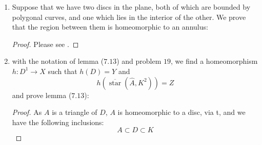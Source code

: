 \documentclass{book}
\DeclareMathOperator*{\Star}{\text{star}}
\begin{document}
\begin{enumerate}[(1)]
    \item Suppose that we have two discs in the plane, both of which are bounded by polygonal curves, and one which lies in the interior of the other. We prove that the region between them is homeomorphic to an annulus: 
        \begin{proof} Please see \cite{jordanCurve}.
        \end{proof}

    \item with the notation of lemma ($7.13$) and problem $19$, we find a homeomorphism $h: D^1 \rightarrow X$ such that $h(D) = Y$ and 
        \[h(\overline{\Star} (\hat{A}, K^2)) = Z\]
        and prove lemma ($7.13$): 
        \begin{proof} As $A$ is a triangle of $D$, $A$ is homeomorphic to a disc, via t, and we have the following inclusions:
            \[ A \subset D \subset K\]
        \end{proof}
\end{enumerate}
\end{document}
